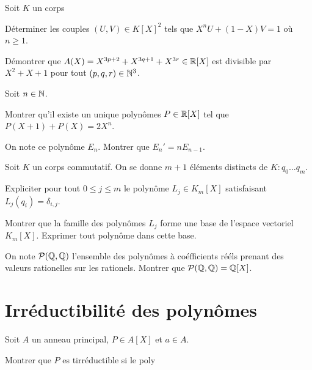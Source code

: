 \documentclass[french]{report}
\begin{document}
\begin{exo}
    Soit \(K\) un corps
    \begin{q}{1}
        Déterminer les couples \(\left(U, V\right)\in K[X]^2\) tels que
        \(X^nU+\left(1-X\right)V=1\) où \(n\geq 1\).
    \end{q}
    \begin{q}{2}
        Démontrer que \(A(X)=X^{3p+2}+X^{3q+1}+X^{3r}\in\mathbb{R}[X]\) est divisible
        par \(X^2+X+1\) pour tout \(\left(p,q,r\right)\in\mathbb{N}^3\).
    \end{q}
\end{exo}

\begin{exo}
    Soit \(n\in\mathbb{N}\).
    \begin{q}{1}
        Montrer qu'il existe un unique polynômes \(P\in\mathbb{R}[X]\) tel que
        \(P(X+1)+P(X) = 2X^n\).
    \end{q}
    \begin{q}{2}
        On note ce polynôme \(E_n\). Montrer que \(E_n'=nE_{n-1}\).
    \end{q}
\end{exo}

\begin{exo}
    Soit \(K\) un corps commutatif. On se donne \(m+1\) éléments distincts de \(K\colon
    q_0\dots q_m\).
    \begin{q}{1}
        Expliciter pour tout \(0\leq j\leq m\) le polynôme \(L_j\in K_m[X]\)
        satisfaisant \(L_j(q_i) = \delta_{i,j}\).
    \end{q}
    \begin{q}{2}
        Montrer que la famille des polynômes \(L_j\) forme une base de l'espace vectoriel
        \(K_m[X]\). Exprimer tout polynôme dans cette base.
    \end{q}
    \begin{q}{3}
        On note \(\mathcal{P}(\mathbb{Q}, \mathbb{Q})\) l'ensemble des polynômes à coéfficients rééls prenant des valeurs
        rationelles sur les rationels. Montrer que \(\mathcal{P}(\mathbb{Q}, \mathbb{Q})=\mathbb{Q}[X]\).
    \end{q}
\end{exo}

\section*{Irréductibilité des polynômes}

\begin{exo}
    Soit \(A\) un anneau principal, \(P\in A[X]\) et \(a\in A\).
    \begin{q}{1}
        Montrer que \(P\) es tirréductible si le poly
    \end{q}
\end{exo}
\end{document}
